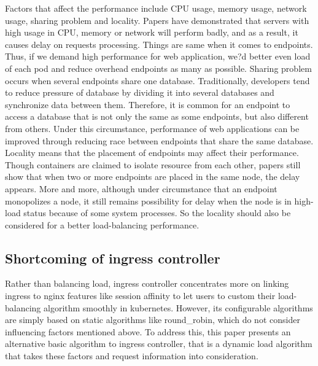 Factors that affect the performance include CPU usage, memory usage, network usage, sharing problem and locality.
Papers have demonstrated that servers with high usage in CPU, memory or network will perform badly, and as a result, it causes delay on requests processing. Things are same when it comes to endpoints. Thus, if we demand high performance for web application, we?d better even load of each pod and reduce overhead endpoints as many as possible.
Sharing problem occurs when several endpoints share one database. Traditionally, developers tend to reduce pressure of database by dividing it into several databases and synchronize data between them. Therefore, it is common for an endpoint to access a database that is not only the same as some endpoints, but also different from others. Under this circumstance, performance of web applications can be improved through reducing race between endpoints that share the same database.
Locality means that the placement of endpoints may affect their performance. Though containers are claimed to isolate resource from each other, papers still show that when two or more endpoints are placed in the same node, the delay appears. More and more, although under circumstance that an endpoint monopolizes a node, it still remains possibility for delay when the node is in high-load status because of some system processes. So the locality should also be considered for a better load-balancing performance.

\subsection{Shortcoming of ingress controller}
\label{subsec:Shortcoming}
Rather than balancing load, ingress controller concentrates more on linking ingress to nginx features like session affinity to let users to custom their load-balancing algorithm smoothly in kubernetes. However, its configurable algorithms are simply based on static algorithms like round\_robin, which do not consider influencing factors mentioned above. To address this, this paper presents an alternative basic algorithm to ingress controller, that is a dynamic load algorithm that takes these factors and request information into consideration.
